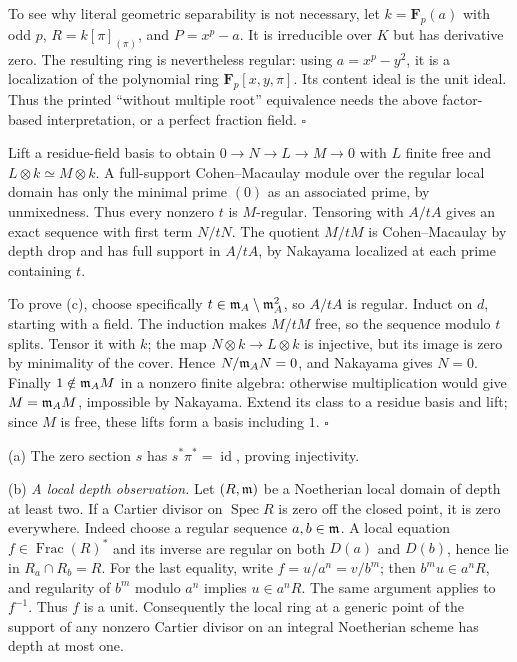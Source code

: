 \documentclass[11pt]{article}
\let\chapterexercise\exercise
\renewcommand{\exercise}[2]{\Needspace{8\baselineskip}\chapterexercise{#1}{#2}}
\begin{document}
To see why literal geometric separability is not necessary, let $k=\mathbf F_p(a)$ with odd $p$, $R=k[\pi]_{(\pi)}$, and $P=x^p-a$. It is irreducible over $K$ but has derivative zero. The resulting ring is nevertheless regular: using $a=x^p-y^2$, it is a localization of the polynomial ring $\mathbf F_p[x,y,\pi]$. Its content ideal is the unit ideal. Thus the printed ``without multiple root'' equivalence needs the above factor-based interpretation, or a perfect fraction field. \hfill$\square$

\pf
Lift a residue-field basis to obtain $0\to N\to L\to M\to0$ with $L$ finite free and $L\otimes k\simeq M\otimes k$. A full-support Cohen--Macaulay module over the regular local domain has only the minimal prime $(0)$ as an associated prime, by unmixedness. Thus every nonzero $t$ is $M$-regular. Tensoring with $A/tA$ gives an exact sequence with first term $N/tN$. The quotient $M/tM$ is Cohen--Macaulay by depth drop and has full support in $A/tA$, by Nakayama localized at each prime containing $t$.

To prove (c), choose specifically $t\in\mathfrak m_A\setminus\mathfrak m_A^2$, so $A/tA$ is regular. Induct on $d$, starting with a field. The induction makes $M/tM$ free, so the sequence modulo $t$ splits. Tensor it with $k$; the map $N\otimes k\to L\otimes k$ is injective, but its image is zero by minimality of the cover. Hence $N/\mathfrak m_AN=0$, and Nakayama gives $N=0$. Finally $1\notin\mathfrak m_AM$ in a nonzero finite algebra: otherwise multiplication would give $M=\mathfrak m_AM$, impossible by Nakayama. Extend its class to a residue basis and lift; since $M$ is free, these lifts form a basis including $1$. \hfill$\square$

\pf
(a) The zero section $s$ has $s^*\pi^*=\operatorname{id}$, proving injectivity.

(b) \emph{A local depth observation.} Let $(R,\mathfrak m)$ be a Noetherian local domain of depth at least two. If a Cartier divisor on $\operatorname{Spec}R$ is zero off the closed point, it is zero everywhere. Indeed choose a regular sequence $a,b\in\mathfrak m$. A local equation $f\in\operatorname{Frac}(R)^*$ and its inverse are regular on both $D(a)$ and $D(b)$, hence lie in $R_a\cap R_b=R$. For the last equality, write $f=u/a^n=v/b^m$; then $b^m u\in a^nR$, and regularity of $b^m$ modulo $a^n$ implies $u\in a^nR$. The same argument applies to $f^{-1}$. Thus $f$ is a unit. Consequently the local ring at a generic point of the support of any nonzero Cartier divisor on an integral Noetherian scheme has depth at most one.
\end{document}
